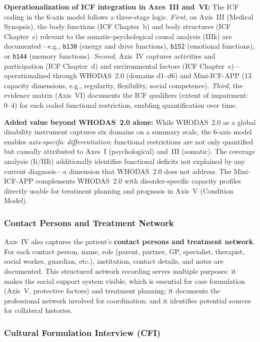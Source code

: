 \documentclass[11pt,a4paper]{article}
\begin{document}
\textbf{Operationalization of ICF integration in Axes~III and~VI:} The ICF coding in the 6-axis model follows a three-stage logic. \textit{First}, on Axis~III (Medical Synopsis), the body functions (ICF Chapter~b) and body structures (ICF Chapter~s) relevant to the somatic-psychological causal analysis (IIIk) are documented---e.g., \texttt{b130} (energy and drive functions), \texttt{b152} (emotional functions), or \texttt{b144} (memory functions). \textit{Second}, Axis~IV captures activities and participation (ICF Chapter~d) and environmental factors (ICF Chapter~e)---operationalized through WHODAS~2.0 (domains d1--d6) and Mini-ICF-APP (13 capacity dimensions, e.g., regularity, flexibility, social competence). \textit{Third}, the evidence matrix (Axis~VI) documents the ICF qualifiers (extent of impairment: 0--4) for each coded functional restriction, enabling quantification over time.

\textbf{Added value beyond WHODAS~2.0 alone:} While WHODAS~2.0 as a global disability instrument captures six domains on a summary scale, the 6-axis model enables \textit{axis-specific differentiation}: functional restrictions are not only quantified but causally attributed to Axes~I (psychological) and~III (somatic). The coverage analysis (Ii/IIIi) additionally identifies functional deficits not explained by any current diagnosis---a dimension that WHODAS~2.0 does not address. The Mini-ICF-APP complements WHODAS~2.0 with disorder-specific capacity profiles directly usable for treatment planning and prognosis in Axis~V (Condition Model).

\subsubsection{Contact Persons and Treatment Network}

Axis~IV also captures the patient's \textbf{contact persons and treatment network}. For each contact person, name, role (parent, partner, GP, specialist, therapist, social worker, guardian, etc.), institution, contact details, and notes are documented. This structured network recording serves multiple purposes: it makes the social support system visible, which is essential for case formulation (Axis~V, protective factors) and treatment planning; it documents the professional network involved for coordination; and it identifies potential sources for collateral histories.

\subsubsection{Cultural Formulation Interview (CFI)}
\end{document}
